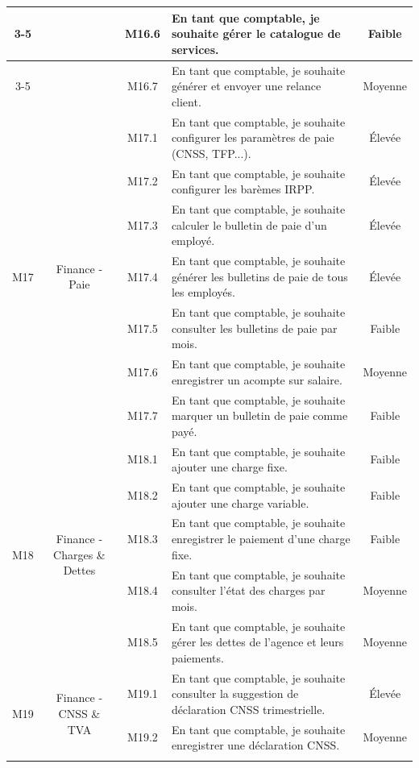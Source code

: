 \begin{longtable}{|c|c|c|p{7.2cm}|c|}
\cline{3-5}
 & & M16.6 & En tant que comptable, je souhaite gérer le catalogue de services. & Faible \\
\cline{3-5}
 & & M16.7 & En tant que comptable, je souhaite générer et envoyer une relance client. & Moyenne \\
\hline
\multirow{7}{*}{M17} & \multirow{7}{*}{Finance - Paie} & M17.1 & En tant que comptable, je souhaite configurer les paramètres de paie (CNSS, TFP...). & Élevée \\
\cline{3-5}
 & & M17.2 & En tant que comptable, je souhaite configurer les barèmes IRPP. & Élevée \\
\cline{3-5}
 & & M17.3 & En tant que comptable, je souhaite calculer le bulletin de paie d'un employé. & Élevée \\
\cline{3-5}
 & & M17.4 & En tant que comptable, je souhaite générer les bulletins de paie de tous les employés. & Élevée \\
\cline{3-5}
 & & M17.5 & En tant que comptable, je souhaite consulter les bulletins de paie par mois. & Faible \\
\cline{3-5}
 & & M17.6 & En tant que comptable, je souhaite enregistrer un acompte sur salaire. & Moyenne \\
\cline{3-5}
 & & M17.7 & En tant que comptable, je souhaite marquer un bulletin de paie comme payé. & Faible \\
\hline
\multirow{5}{*}{M18} & \multirow{5}{*}{Finance - Charges \& Dettes} & M18.1 & En tant que comptable, je souhaite ajouter une charge fixe. & Faible \\
\cline{3-5}
 & & M18.2 & En tant que comptable, je souhaite ajouter une charge variable. & Faible \\
\cline{3-5}
 & & M18.3 & En tant que comptable, je souhaite enregistrer le paiement d'une charge fixe. & Faible \\
\cline{3-5}
 & & M18.4 & En tant que comptable, je souhaite consulter l'état des charges par mois. & Moyenne \\
\cline{3-5}
 & & M18.5 & En tant que comptable, je souhaite gérer les dettes de l'agence et leurs paiements. & Moyenne \\
\hline
\multirow{4}{*}{M19} & \multirow{4}{*}{Finance - CNSS \& TVA} & M19.1 & En tant que comptable, je souhaite consulter la suggestion de déclaration CNSS trimestrielle. & Élevée \\
\cline{3-5}
 & & M19.2 & En tant que comptable, je souhaite enregistrer une déclaration CNSS. & Moyenne \\
\cline{3-5}

\end{longtable}
